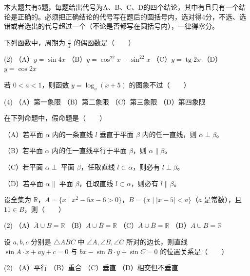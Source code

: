 本大题共有5题，每题给出代号为A、B、C、D的四个结论，其中有且只有一个结论是正确的。必须把正确结论的代号写在题后的圆括号内，选对得4分，不选、选错或者选出的代号超过一个（不论是否都写在圆括号内），一律得零分。

\begin{question}
下列函数中，周期为 $\frac\pi2$ 的偶函数是\mbox{（　　）}

\begin{gkopts}(2)
\task （A）$y=\sin4x$
\task （B）$y=\cos^22x-\sin^22x$
\task （C）$y=\operatorname{tg}2x$
\task （D）$y=\cos2x$
\end{gkopts}

\end{question}
\begin{question}
若 $0<a<1$，则函数 $y=\log_a(x+5)$ 的图象不过\mbox{（　　）}

\begin{gkopts}(4)
\task （A）第一象限
\task （B）第二象限
\task （C）第三象限
\task （D）第四象限
\end{gkopts}

\end{question}
\begin{question}
在下列命题中，假命题是\mbox{（　　）}

（A）若平面 $\alpha$ 内的一条直线 $l$ 垂直于平面 $\beta$ 内的任一直线，则 $\alpha\perp\beta$。

（B）若平面 $\alpha$ 内的任一直线平行于平面 $\beta$，则 $\alpha\parallel\beta$。

（C）若平面 $\alpha\perp$ 平面 $\beta$，任取直线 $l\subset\alpha$，则必有 $l\perp\beta$。

（D）若平面 $\alpha\parallel$ 平面 $\beta$，任取直线 $l\subset\alpha$，则必有 $l\parallel\beta$。

\end{question}
\begin{question}
设全集为 $\mathbb R$，$A=\{x\mid x^2-5x-6>0\}$，$B=\{x\mid |x-5|<a\}$（$a$ 是常数），且 $11\in B$，则\mbox{（　　）}

\begin{gkopts}(2)
\task （A）$\overline A\cup B=\mathbb R$
\task （B）$A\cup\overline B=\mathbb R$
\task （C）$\overline A\cup\overline B=\mathbb R$
\task （D）$A\cup B=\mathbb R$
\end{gkopts}

\end{question}
\begin{question}
设 $a,b,c$ 分别是 $\triangle ABC$ 中 $\angle A,\angle B,\angle C$ 所对的边长，则直线 $\sin A\cdot x+ay+c=0$ 与 $bx-\sin B\cdot y+\sin C=0$ 的位置关系是\mbox{（　　）}

\begin{gkopts}(2)
\task （A）平行
\task （B）重合
\task （C）垂直
\task （D）相交但不垂直
\end{gkopts}

\end{question}

